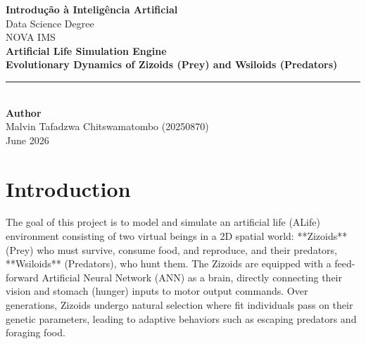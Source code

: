 \documentclass[11pt,a4paper]{article}
\begin{document}
\begin{titlepage}
    \centering
    \vspace*{2cm}
    
    {\LARGE \textbf{Introdução à Inteligência Artificial}}\\[8pt]
    {\Large Data Science Degree}\\[4pt]
    {\large NOVA IMS}\\[1.5cm]
    
    {\Huge \textbf{Artificial Life Simulation Engine}}\\[0.8cm]
    {\Large \textbf{Evolutionary Dynamics of Zizoids (Prey) and Wsiloids (Predators)}}\\[2.0cm]
    
    \rule{0.8\textwidth}{0.4pt}\\[0.5cm]
    {\Large \textbf{Author}}\\[6pt]
    {\Large Malvin Tafadzwa Chitswamatombo (20250870)}\\[2cm]
    
    {\large June 2026}
    
    \vfill
\end{titlepage}

\newpage

\section{Introduction}

The goal of this project is to model and simulate an artificial life (ALife) environment consisting of two virtual beings in a 2D spatial world: **Zizoids** (Prey) who must survive, consume food, and reproduce, and their predators, **Wsiloids** (Predators), who hunt them. The Zizoids are equipped with a feed-forward Artificial Neural Network (ANN) as a brain, directly connecting their vision and stomach (hunger) inputs to motor output commands. Over generations, Zizoids undergo natural selection where fit individuals pass on their genetic parameters, leading to adaptive behaviors such as escaping predators and foraging food.
\end{document}

